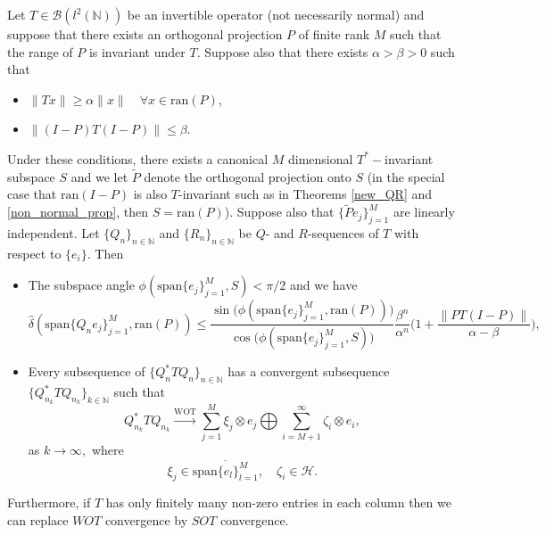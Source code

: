 \documentclass[a4paper,10pt]{article}
\begin{document}
\begin{theorem}
\label{non_normal_prop2}
Let $T \in \mathcal{B}(l^2(\mathbb{N}))$ be an invertible operator (not necessarily normal) and suppose that there exists an orthogonal projection $P$ of finite rank $M$ such that the range of $P$ is invariant under $T$. Suppose also that there exists $\alpha>\beta>0$ such that
\begin{itemize}
	\item $\|Tx\|\geq \alpha\|x\| \quad \forall x\in \mathrm{ran}(P)$,
	\item $\|(I-P)T(I-P)\|\leq \beta$.
\end{itemize}
Under these conditions, there exists a canonical $M$ dimensional $T^*-$invariant subspace $S$ and we let $\tilde P$ denote the orthogonal projection onto $S$ (in the special case that $\mathrm{ran}(I-P)$ is also $T$-invariant such as in Theorems \ref{new_QR} and \ref{non_normal_prop}, then $S=\mathrm{ran}(P)$). Suppose also that $\{\tilde Pe_j\}_{j=1}^M$ are linearly independent. Let $\{Q_n\}_{n\in\mathbb{N}}$ and $\{R_n\}_{n\in\mathbb{N}}$ be $Q$- and $R$-sequences of $T$ with respect to $\{e_i\}.$ Then
\begin{itemize}
	\item[(i)] The subspace angle $\phi(\mathrm{span}\{e_j\}_{j=1}^M,S)<\pi/2$ and we have
	\begin{equation}
	\label{beautiful}
	\hat\delta (\mathrm{span}\{Q_n e_j\}_{j=1}^M,\mathrm{ran}(P))\leq \frac{\sin\big(\phi(\mathrm{span}\{e_j\}_{j=1}^M,\mathrm{ran}(P))\big)}{\cos\big(\phi(\mathrm{span}\{e_j\}_{j=1}^M,S)\big)}\frac{\beta^n}{\alpha^n}\Big(1+\frac{\|PT(I-P)\|}{\alpha-\beta}\Big),
	\end{equation}
	\item[(ii)] Every subsequence of $\{Q_n^*TQ_n\}_{n\in\mathbb{N}}$ has a convergent subsequence 
$\{Q_{n_k}^*TQ_{n_k}\}_{k\in\mathbb{N}}$ such that 
\begin{equation*}
Q_{n_k}^*TQ_{n_k} \stackrel{\text{WOT}}{\longrightarrow} \sum_{j=1}^M \xi_j \otimes e_j \bigoplus \sum_{i=M+1}^{\infty} \zeta_i \otimes e_i, 
\end{equation*}
as $k \rightarrow \infty,$ where
$$
\xi_j \in \overline{\mathrm{span}\{e_l\}_{l=1}^M}, \quad \zeta_i\in \mathcal{H}.$$
\end{itemize}
Furthermore, if $T$ has only finitely many non-zero entries in each column then we can replace $WOT$ convergence by $SOT$ convergence.
\end{theorem}
\end{document}
